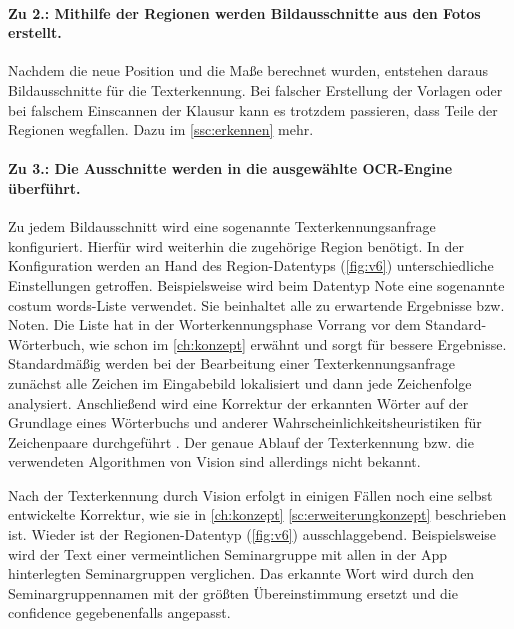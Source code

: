 \documentclass[notables, nomenclature, oneside, 150]{HSMW-Thesis}
\begin{document}
				\paragraph*{Zu 2.: Mithilfe der Regionen werden Bildausschnitte aus den Fotos erstellt.}
					Nachdem die neue Position und die Maße berechnet wurden, entstehen daraus Bildausschnitte für die Texterkennung. Bei falscher Erstellung der Vorlagen oder bei falschem Einscannen der Klausur kann es trotzdem passieren, dass Teile der Regionen wegfallen. Dazu im \autoref{ssc:erkennen} mehr.
				
				\paragraph*{Zu 3.: Die Ausschnitte werden in die ausgewählte OCR-Engine überführt.}
					Zu jedem Bildausschnitt wird eine sogenannte Texterkennungsanfrage konfiguriert. Hierfür wird weiterhin die zugehörige Region benötigt. In der Konfiguration werden an Hand des Region-Datentyps (\ref{fig:v6}) unterschiedliche Einstellungen getroffen. Beispielsweise wird beim Datentyp Note eine sogenannte costum words-Liste verwendet. Sie beinhaltet alle zu erwartende Ergebnisse bzw. Noten. Die Liste hat in der Worterkennungsphase Vorrang vor dem Standard-Wörterbuch, wie schon im \autoref{ch:konzept} erwähnt und sorgt für bessere Ergebnisse.						
					Standardmäßig werden bei der Bearbeitung einer Texterkennungsanfrage zunächst alle Zeichen im Eingabebild lokalisiert und dann jede Zeichenfolge analysiert. Anschließend wird eine Korrektur der erkannten Wörter auf der Grundlage eines Wörterbuchs und anderer Wahrscheinlichkeitsheuristiken für Zeichenpaare durchgeführt \cite{apple_text_2019}. Der genaue Ablauf der Texterkennung bzw. die verwendeten Algorithmen von Vision sind allerdings nicht bekannt. 
				
					Nach der Texterkennung durch Vision erfolgt in einigen Fällen noch eine selbst entwickelte Korrektur, wie sie in \autoref{ch:konzept} \autoref{sc:erweiterungkonzept} beschrieben ist. Wieder ist der Regionen-Datentyp (\ref{fig:v6}) ausschlaggebend. Beispielsweise wird der Text einer vermeintlichen Seminargruppe mit allen in der App hinterlegten Seminargruppen verglichen. Das erkannte Wort wird durch den Seminargruppennamen mit der größten Übereinstimmung ersetzt und die confidence gegebenenfalls angepasst.
				
\end{document}
